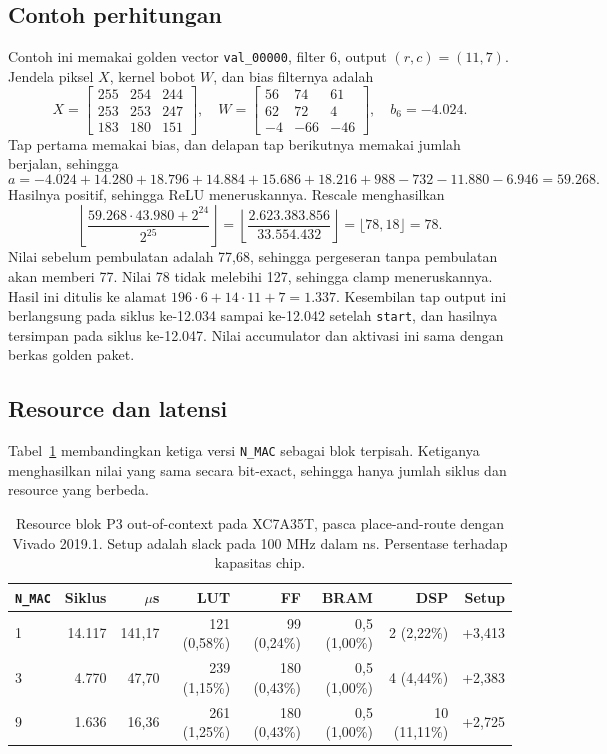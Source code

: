 \documentclass[11pt,a4paper]{article}
\begin{document}
\subsection{Contoh perhitungan}
Contoh ini memakai golden vector \texttt{val\_00000}, filter 6, output
\((r,c)=(11,7)\). Jendela piksel \(X\), kernel bobot \(W\), dan bias filternya
adalah
\[
 X=\begin{bmatrix}255&254&244\\253&253&247\\183&180&151\end{bmatrix},\quad
 W=\begin{bmatrix}56&74&61\\62&72&4\\-4&-66&-46\end{bmatrix},\quad
 b_6=-4.024.
\]
Tap pertama memakai bias, dan delapan tap berikutnya memakai jumlah berjalan,
sehingga
\[
 a=-4.024+14.280+18.796+14.884+15.686+18.216+988-732-11.880-6.946=59.268.
\]
Hasilnya positif, sehingga ReLU meneruskannya. Rescale menghasilkan
\[
 \left\lfloor\frac{59.268\cdot43.980+2^{24}}{2^{25}}\right\rfloor
 =\left\lfloor\frac{2.623.383.856}{33.554.432}\right\rfloor
 =\lfloor78{,}18\rfloor=78.
\]
Nilai sebelum pembulatan adalah 77,68, sehingga pergeseran tanpa pembulatan akan
memberi 77. Nilai 78 tidak melebihi 127, sehingga clamp meneruskannya. Hasil ini
ditulis ke alamat \(196\cdot6+14\cdot11+7=1.337\). Kesembilan tap output ini
berlangsung pada siklus ke-12.034 sampai ke-12.042 setelah \texttt{start}, dan
hasilnya tersimpan pada siklus ke-12.047. Nilai accumulator dan aktivasi ini
sama dengan berkas golden paket.

\subsection{Resource dan latensi}
Tabel~\ref{tab:p3-resource} membandingkan ketiga versi \texttt{N\_MAC} sebagai
blok terpisah. Ketiganya menghasilkan nilai yang sama secara bit-exact, sehingga
hanya jumlah siklus dan resource yang berbeda.

\begin{table}[H]
\centering\small
\setlength{\tabcolsep}{4pt}
\caption{Resource blok P3 out-of-context pada XC7A35T, pasca place-and-route dengan Vivado 2019.1. Setup adalah slack pada 100 MHz dalam ns. Persentase terhadap kapasitas chip.}
\label{tab:p3-resource}
\begin{tabular}{lrrrrrrr}
\toprule
\texttt{N\_MAC} & Siklus & $\mu$s & LUT & FF & BRAM & DSP & Setup \\
\midrule
1 & 14.117 & 141,17 & 121 (0,58\%) & 99 (0,24\%) & 0,5 (1,00\%) & 2 (2,22\%) & +3,413 \\
3 & 4.770 & 47,70 & 239 (1,15\%) & 180 (0,43\%) & 0,5 (1,00\%) & 4 (4,44\%) & +2,383 \\
9 & 1.636 & 16,36 & 261 (1,25\%) & 180 (0,43\%) & 0,5 (1,00\%) & 10 (11,11\%) & +2,725 \\
\bottomrule
\end{tabular}
\end{table}
\end{document}
